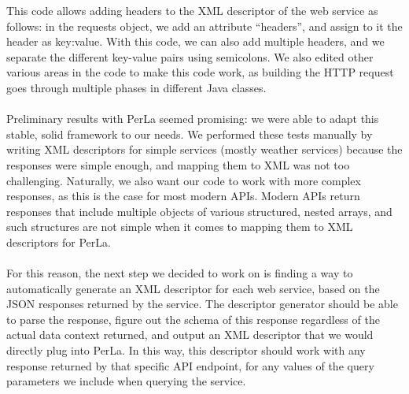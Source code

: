 \noindent This code allows adding headers to the XML descriptor of the web service as follows: in the requests object, we add an attribute ``headers'', and assign to it the header as key:value. With this code, we can also add multiple headers, and we separate the different key-value pairs using semicolons. We also edited other various areas in the code to make this code work, as building the HTTP request goes through multiple phases in different Java classes.\\\\
Preliminary results with PerLa seemed promising: we were able to adapt this stable, solid framework to our needs. We performed these tests manually by writing XML descriptors for simple services (mostly weather services) because the responses were simple enough, and mapping them to XML was not too challenging. Naturally, we also want our code to work with more complex responses, as this is the case for most modern APIs. Modern APIs return responses that include multiple objects of various structured, nested arrays, and such structures are not simple when it comes to mapping them to XML descriptors for PerLa.\\\\
For this reason, the next step we decided to work on is finding a way to automatically generate an XML descriptor for each web service, based on the JSON responses returned by the service. The descriptor generator should be able to parse the response, figure out the schema of this response regardless of the actual data context returned, and output an XML descriptor that we would directly plug into PerLa. In this way, this descriptor should work with any response returned by that specific API endpoint, for any values of the query parameters we include when querying the service.\\\\

